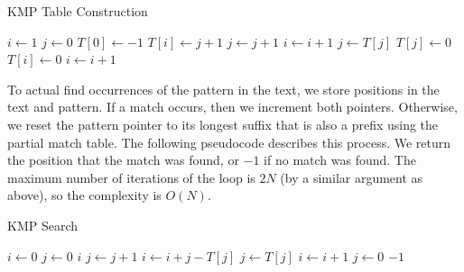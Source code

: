 \documentclass[11pt]{article}
\begin{document}
\begin{algorithm}[H]
\caption{KMP Table Construction}
\begin{algorithmic}
        \State $i \gets 1$ 
        \State $j \gets 0$ 
        \State $T[0] \gets -1$
                \State $T[i] \gets j+1$
                \State $j \gets j+1$
                \State $i \gets i+1$
                \State $j \gets T[j]$
                \State $T[j] \gets 0$
            \Else
                \State $T[i] \gets 0$
                \State $i \gets i+1$
            \EndIf
        \EndWhile
    \EndFunction
\end{algorithmic}
\end{algorithm}

To actual find occurrences of the pattern in the text, we store positions in the text and pattern. If a match occurs, then we increment both pointers. Otherwise, we reset the pattern pointer to its longest suffix that is also a prefix using the partial match table. The following pseudocode describes this process. We return the position that the match was found, or $-1$ if no match was found. The maximum number of iterations of the loop is $2N$ (by a similar argument as above), so the complexity is $O(N)$. 

\begin{algorithm}[H]
\caption{KMP Search}
\begin{algorithmic}
        \State $i \gets 0$ 
        \State $j \gets 0$ 
                    \State \Return $i$
                \Else
                    \State $j \gets j+1$
                \EndIf
            \Else
                    \State $i \gets i+j-T[j]$
                    \State $j \gets T[j]$
                \Else
                    \State $i \gets i+1$
                    \State $j \gets 0$
                \EndIf
            \EndIf
        \EndWhile
        \State \Return $-1$
    \EndFunction
\end{algorithmic}
\end{algorithm}
\end{document}
